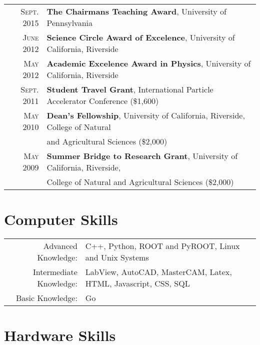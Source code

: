\documentclass[a4paper,10pt]{article} %
\begin{document}
\begin{tabular}{rl}
\textsc{Sept.} 2015 & \textbf{The Chairmans Teaching Award}, University of Pennsylvania \\
\textsc{June} 2012  & \textbf{Science Circle Award of Excelence}, University of California, Riverside \\
\textsc{May} 2012   & \textbf{Academic Excelence Award in Physics}, University of California, Riverside \\
\textsc{Sept.} 2011 & \textbf{Student Travel Grant}, International Particle Accelerator Conference \footnotesize(\$1,600)\normalsize\\
\textsc{May} 2010   & \textbf{Dean's Fellowship}, University of California, Riverside, College of Natural\\
				    & and Agricultural Sciences \footnotesize(\$2,000)\normalsize\\
\textsc{May} 2009   & \textbf{Summer Bridge to Research Grant}, University of California, Riverside, \\
			        & College of Natural and Agricultural Sciences \footnotesize(\$2,000)\normalsize\\

\end{tabular}


\section{Computer Skills}

\begin{tabular}{rl}

Advanced Knowledge: & C++, Python, ROOT and PyROOT, Linux and Unix Systems \\
Intermediate Knowledge: & LabView, AutoCAD, MasterCAM, Latex, HTML, Javascript, CSS, SQL\\
Basic Knowledge:        & Go
\end{tabular}


\section{Hardware Skills}
\end{document}
